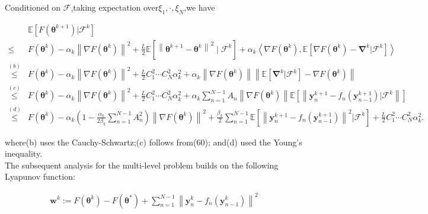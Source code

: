 Conditioned on $\mathcal{F}$,taking expectation over$\xi_1,\cdot,\xi_N$,we have

\begin{equation*}
\begin{split}
&\mathbb{E}\left[ F\left(\boldsymbol{\theta}^{k+1}\right)|\mathcal{F}^k\right]\\
\leq &F(\boldsymbol{\theta}^k)-\alpha_k\left \| \nabla F(\boldsymbol{\theta}^k) \right \|^2+\frac{L}{2}\mathbb{E}\left [ \left \| \boldsymbol{\theta}^{k+1}-\boldsymbol{\theta}^k \right \|^2\mid \mathcal{F}^k \right ]+\alpha_k\left \langle \nabla F(\boldsymbol{\theta}^k),\mathbb{E}\left [\nabla F(\boldsymbol{\theta}^k)-\boldsymbol{\nabla}^k|\mathcal{F}^k \right ] \right \rangle\\
\overset{(b)}{\leq}&F(\boldsymbol{\theta}^k)-\alpha_k\left \| \nabla F(\boldsymbol{\theta}^k) \right \|^2+\frac{L}{2}C_1^2\cdots C_N^2\alpha_k^2+\alpha_k\left \| \nabla F(\boldsymbol{\theta}^k) \right \|\left \| \mathbb{E}\left [ \boldsymbol{\nabla}^k|\mathcal{F}^k \right ]-\nabla F(\boldsymbol{\theta}^k)\right \|\\
\overset{(c)}{\leq}&F(\boldsymbol{\theta}^k)-\alpha_k\left \| \nabla F(\boldsymbol{\theta}^k) \right \|^2+\frac{L}{2}C_1^2\cdots C_N^2\alpha_k^2+\alpha_k\sum_{n=1}^{N-1}A_n\left \| \nabla F(\boldsymbol{\theta}^k) \right \|\mathbb{E}\left [ \left \| \boldsymbol{y}_n^{k+1}-f_n(\boldsymbol{y}_{n-1}^{k+1})|\mathcal{F}^k \right \| \right ]\\
\overset{(d)}{\leq}&F(\boldsymbol{\theta}^k)-\alpha_k\left ( 1-\frac{\alpha_k}{2\beta_k}\sum_{n=1}^{N-1}A_n^2 \right )\left \| \nabla F(\boldsymbol{\theta}^k) \right \|^2+\frac{\beta_k}{2}\sum_{n=1}^{N-1}\mathbb{E}\left [\left \| \boldsymbol{y}_n^{k+1}-f_n(\boldsymbol{y}_{n-1}^{k+1}) \right \|^2|\mathcal{F}^k \right ]+\frac{L}{2}C_1^2\cdots C_N^2\alpha_k^2.
\end{split}
\end{equation*}

where(b) uses the Cauchy-Schwartz;(c) follows from(60); and(d) used the Young's inequality.\\
The subsequent analysis for the multi-level problem builds on the following Lyapunov function:

\begin{equation*}
\begin{split}
\boldsymbol{w}^k:=F(\boldsymbol{\theta}^k)-F(\boldsymbol{\theta}^*)+\sum_{n=1}^{N-1}\left \| \boldsymbol{y}_n^k-f_n(\boldsymbol{y}_{n-1}^k) \right \|^2
\end{split}
\end{equation*}


